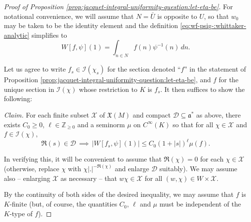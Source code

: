 \begin{proof}[Proof of Proposition \ref{prop:jacquet-integral-uniformity-question:let-eta-be}]
  For notational convenience, we will assume that $N = \bar{U}$ is opposite to $U$, so that $w_0$ may be taken to be the identity element and the definition \ref{eq:wf-psig-:whittaker-analytic} simplifies to
  \begin{equation}\label{eq:wf-psi1-=whittaker-integral-simplified}
    W[f, \psi](1) = \int_{n \in N } f (n) \psi^{-1}(n) \, d n.
  \end{equation}

  Let us agree to write $f_s \in \mathcal{I}(\chi_s)$ for the section denoted ``$f$'' in the statement of Proposition \ref{prop:jacquet-integral-uniformity-question:let-eta-be}, and $f$ for the unique section in $\mathcal{I}(\chi)$ whose restriction to $K$ is $f_s$.  It then suffices to show the following:

  \emph{Claim.}  For each finite subset $\mathcal{X}$ of  $\mathfrak{X}(M)$ and compact $\mathcal{D} \subseteq \mathfrak{a}^*$ as above, there exists $C_0 \geq 0$, $\ell \in \mathbb{Z}_{\geq 0}$ and a seminorm $\mu$ on $C^\infty(K)$ so that for all $\chi \in \mathcal{X}$ and $f \in \mathcal{I}(\chi)$,
  \begin{equation}\label{eq:wfchi-psi1-leq}
    \Re(s) \in \mathcal{D} \, \implies \, |W[f_s, \psi](1)| \leq C_0 (1 + |s|)^{\ell} \mu(f).
  \end{equation}

  In verifying this, it will be convenient to assume that $\Re(\chi) = 0$ for each $\chi \in \mathcal{X}$ (otherwise, replace $\chi$ with $\chi |.|^{-\Re(\chi)}$ and enlarge $\mathcal{D}$ suitably).  We may assume also -- enlarging $\mathcal{X}$ as necessary -- that $w \chi \in \mathcal{X}$ for all $(w,\chi) \in W \times \mathcal{X}$.

  By the continuity of both sides of the desired inequality, we may assume that $f$ is $K$-finite (but, of course, the quantities $C_0$, $\ell$ and $\mu$ must be independent of the $K$-type of $f$).


\end{proof}
